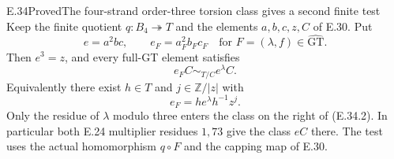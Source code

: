 \begin{statement}{E.34}{Proved}{The four-strand order-three torsion class gives a second finite test}
Keep the finite quotient $q:B_4\twoheadrightarrow T$ and the
elements $a,b,c,z,C$ of E.30.  Put
\[
 e=a^2bc,\qquad e_F=a_F^2b_Fc_F
       \quad\text{for }F=(\lambda,f)\in\widehat{\mathrm{GT}}.
 \tag{E.34.1}
\]
Then $e^3=z$, and every full-GT element satisfies
\[
                   e_F C\sim_{T/C} e^\lambda C.
 \tag{E.34.2}
\]
Equivalently there exist $h\in T$ and
$j\in\mathbb Z/|z|$ with
\[
                       e_F=h e^\lambda h^{-1}z^j.
 \tag{E.34.3}
\]
Only the residue of $\lambda$ modulo three enters the
class on the right of \textup{(E.34.2)}.  In particular
both E.24 multiplier residues $1,73$ give the class
$eC$ there.  The test uses the actual homomorphism
$q\circ F$ and the capping map of E.30.
\end{statement}
